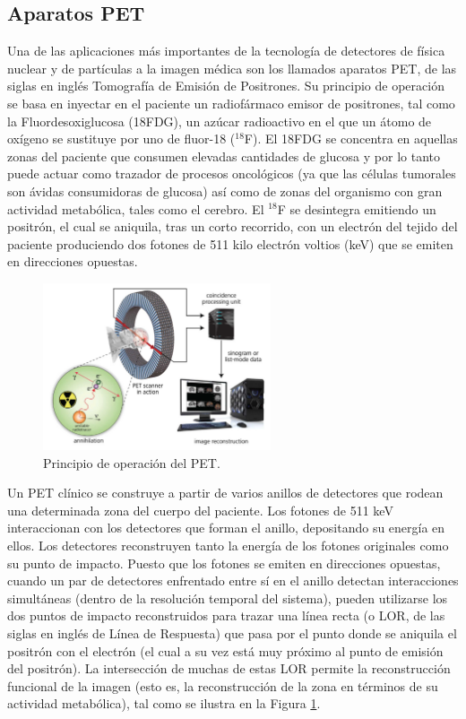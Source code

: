 
\subsection*{Aparatos PET}

 Una de las aplicaciones más importantes de la tecnología de detectores de física nuclear y de partículas a la imagen médica son los llamados aparatos PET, de las siglas en inglés Tomografía de Emisión de Positrones. Su principio de operación se basa en inyectar en el paciente un radiofármaco emisor de positrones, tal como la Fluordesoxiglucosa (18FDG), un azúcar radioactivo en el que un átomo de oxígeno se sustituye por uno de fluor-18 (\ensuremath{^{18}}F). El 18FDG se concentra en aquellas zonas del paciente que consumen elevadas cantidades de glucosa y por lo tanto puede actuar como trazador de procesos oncológicos (ya que las células tumorales son ávidas consumidoras de glucosa) así como de zonas del organismo con gran actividad metabólica, tales como el cerebro. El \ensuremath{^{18}}F se desintegra emitiendo un positrón, el cual se aniquila, tras un corto recorrido, con un electrón del tejido del paciente produciendo dos fotones de 511 kilo electrón voltios (keV) que se emiten en direcciones opuestas. 


\begin{figure}
\centering
\includegraphics[width=0.6\textwidth]{img/PET.jpg}
\caption{\small Principio de operación del PET.} \label{fig.PET}
\end{figure} 


Un PET clínico se construye a partir de varios anillos de detectores que rodean una determinada zona del cuerpo del paciente. Los fotones de 511 keV interaccionan con los detectores que forman el anillo, depositando su energía en ellos. Los detectores reconstruyen tanto la energía de los fotones originales como su punto de impacto. Puesto que los fotones se emiten en direcciones opuestas, cuando un par de detectores enfrentado entre sí en el anillo detectan interacciones simultáneas (dentro de la resolución temporal del sistema), pueden utilizarse los dos puntos de impacto reconstruidos para trazar una línea recta (o LOR, de las siglas en inglés de Línea de Respuesta) que pasa por el punto donde se aniquila el positrón con el electrón (el cual a su vez está muy próximo al punto de emisión del positrón). La intersección de muchas de estas LOR permite la reconstrucción funcional de la imagen (esto es, la reconstrucción de la zona en términos de su actividad metabólica), tal como se ilustra en la Figura \ref{fig.PET}.

